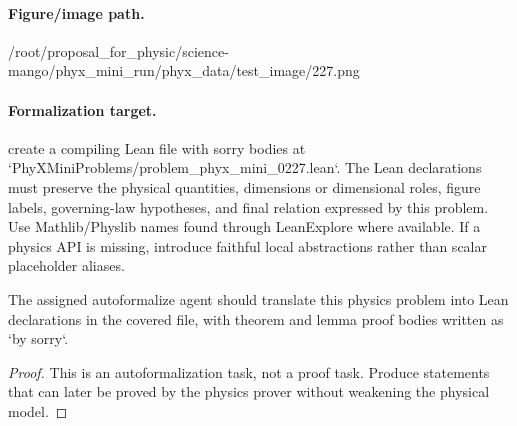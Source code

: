 \paragraph{Figure/image path.}
/root/proposal\_for\_physic/science-mango/phyx\_mini\_run/phyx\_data/test\_image/227.png

\paragraph{Formalization target.}
create a compiling Lean file with sorry bodies at `PhyXMiniProblems/problem\_phyx\_mini\_0227.lean`. The Lean declarations must preserve the physical quantities, dimensions or dimensional roles, figure labels, governing-law hypotheses, and final relation expressed by this problem.
Use Mathlib/Physlib names found through LeanExplore where available. If a physics API is missing, introduce faithful local abstractions rather than scalar placeholder aliases.

\begin{theorem}
\label{thm:physics:phyx_mini_0227:target}
The assigned autoformalize agent should translate this physics problem into Lean declarations in the covered file, with theorem and lemma proof bodies written as `by sorry`.
\end{theorem}
\begin{proof}
This is an autoformalization task, not a proof task. Produce statements that can later be proved by the physics prover without weakening the physical model.
\end{proof}

